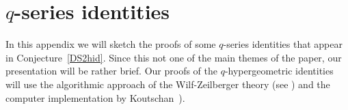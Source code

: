 \documentclass[12pt,reqno]{amsart}
\theoremstyle{definition}
\begin{document}

\appendix

\section{$q$-series identities}
\label{Appqserids}

In this appendix we will sketch the proofs of some $q$-series identities
that appear in Conjecture~\ref{DS2hid}. Since this not one of the main
themes of the paper, our presentation will be rather brief. Our proofs of the
$q$-hypergeometric identities will use the algorithmic approach of the Wilf-Zeilberger
theory (see \cite{WZ,PWZ}) and the computer implementation by
Koutschan~\cite{Koutschan:holofunctions}). 

\end{document}
